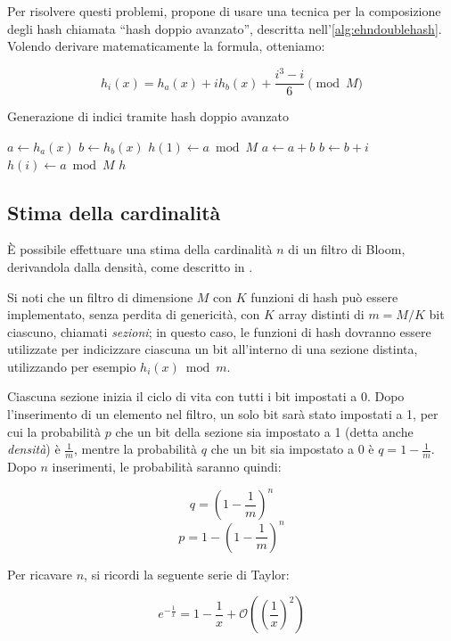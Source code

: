 Per risolvere questi problemi, \cite{bloom-doublehash} propone di usare una tecnica per la
composizione degli hash chiamata ``hash doppio avanzato'', descritta
nell'\autoref{alg:ehndoublehash}. Volendo derivare matematicamente la formula, otteniamo:

$$ h_i(x) = h_a(x) + ih_b(x) + \frac{i^3-i}{6} \pmod M $$

\begin{algorithm}
\caption{Generazione di indici tramite hash doppio avanzato}
\label{alg:ehndoublehash}
\begin{algorithmic}[1]
	\State $a \gets h_a(x)$
	\State $b \gets h_b(x)$
	\State $h(1) \gets a \bmod M$
		\State $a \gets a+b$
		\State $b \gets b+i$
		\State $h(i) \gets a \bmod M$
	\EndFor
	\State \Return $h$
\EndProcedure
\end{algorithmic}
\end{algorithm}

\subsection{Stima della cardinalità}
\label{sec:bloomcard}

È possibile effettuare una stima della cardinalità $n$ di un filtro di Bloom, derivandola
dalla densità, come descritto in \cite{bloom-scalable}.

Si noti che un filtro di dimensione $M$ con $K$ funzioni di hash può essere implementato, senza
perdita di genericità, con $K$ array distinti di $m=M/K$ bit ciascuno, chiamati
\emph{sezioni}; in questo caso, le funzioni di hash dovranno essere utilizzate per indicizzare
ciascuna un bit all'interno di una sezione distinta, utilizzando per esempio $h_i(x) \bmod m$.

Ciascuna sezione inizia il ciclo di vita con tutti i bit impostati a 0. Dopo l'inserimento di un
elemento nel filtro, un solo bit sarà stato impostati a 1, per cui la probabilità $p$ che un bit
della sezione sia impostato a 1 (detta anche \emph{densità}) è $\frac{1}{m}$, mentre la probabilità
$q$ che un bit sia impostato a 0 è $ q=1-\frac{1}{m}$. Dopo $n$ inserimenti, le probabilità saranno
quindi: 

$$ q = (1-\frac{1}{m})^n $$
$$ p = 1-(1-\frac{1}{m})^n $$

Per ricavare $n$, si ricordi la seguente serie di Taylor:

$$ e^{-\frac{1}{x}} = 1 - \frac{1}{x} + \mathcal{O}((\frac{1}{x})^2) $$


